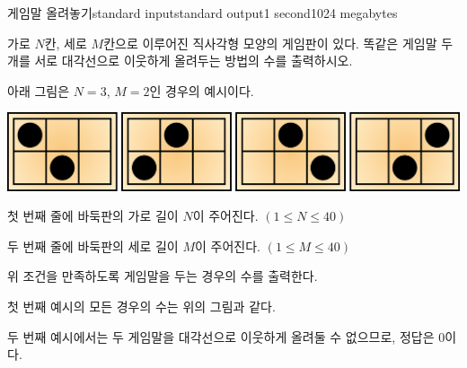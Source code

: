 \begin{problem}{게임말 올려놓기}{standard input}{standard output}{1 second}{1024 megabytes}

가로 $N$칸, 세로 $M$칸으로 이루어진 직사각형 모양의 게임판이 있다. 똑같은 게임말 두 개를 서로 대각선으로 이웃하게 올려두는 방법의 수를 출력하시오.

아래 그림은 $N = 3$, $M = 2$인 경우의 예시이다.
\begin{center}
\includegraphics{grid.png}
\end{center}

\InputFile
첫 번째 줄에 바둑판의 가로 길이 $N$이 주어진다. $(1 \le N \le 40)$

두 번째 줄에 바둑판의 세로 길이 $M$이 주어진다. $(1 \le M \le 40)$

\OutputFile
위 조건을 만족하도록 게임말을 두는 경우의 수를 출력한다.

\Examples

\begin{example}
%
%
%
\end{example}

\Note
첫 번째 예시의 모든 경우의 수는 위의 그림과 같다.

두 번째 예시에서는 두 게임말을 대각선으로 이웃하게 올려둘 수 없으므로, 정답은 $0$이다.

\end{problem}

